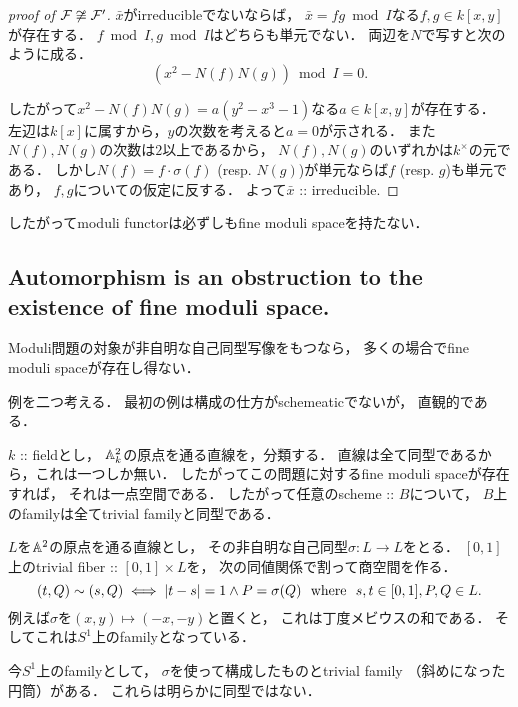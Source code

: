 \documentclass[a4paper]{jsarticle}
\newcommand{\famF}{\mathcal{F}}
\begin{document}
\begin{proof}[proof of $\famF \not \iso \famF'$]
        $\bar{x}$がirreducibleでないならば，
        $\bar{x}=fg \bmod I$なる$f,g \in k[x,y]$が存在する．
        $f \bmod I, g \bmod I$はどちらも単元でない．
        両辺を$N$で写すと次のように成る．
        \[ (x^2-N(f)N(g)) \bmod I=0. \]

        したがって$x^2-N(f)N(g)=a(y^2-x^3-1)$なる$a \in k[x,y]$が存在する．
        左辺は$k[x]$に属すから，$y$の次数を考えると$a=0$が示される．
        また$N(f), N(g)$の次数は$2$以上であるから，
        $N(f), N(g)$のいずれかは$k^{\times}$の元である．
        しかし$N(f)=f \cdot \sigma(f)$ (resp. $N(g)$)が単元ならば$f$ (resp. $g$)も単元であり，
        $f,g$についての仮定に反する．
        よって$\bar{x}$ :: irreducible.
    \end{proof}

    したがってmoduli functorは必ずしもfine moduli spaceを持たない．

    \subsection{Automorphism is an obstruction to the existence of fine moduli space.}
    Moduli問題の対象が非自明な自己同型写像をもつなら，
    多くの場合でfine moduli spaceが存在し得ない．

    例を二つ考える．
    最初の例は構成の仕方がschemeaticでないが，
    直観的である．
    \begin{Example}
        $k$ :: fieldとし，
        $\mathbb{A}^2_k$の原点を通る直線を，分類する．
        直線は全て同型であるから，これは一つしか無い．
        したがってこの問題に対するfine moduli spaceが存在すれば，
        それは一点空間である．
        したがって任意のscheme :: $B$について，
        $B$上のfamilyは全てtrivial familyと同型である．
        
        $L$を$\mathbb{A}^2$の原点を通る直線とし，
        その非自明な自己同型$\sigma: L \to L$をとる．
        $[0,1]$上のtrivial fiber :: $[0,1] \times L$を，
        次の同値関係で割って商空間を作る．
        \[ (t, Q) \sim (s, Q) \iff |t-s|=1 \land P=\sigma(Q) ~~\text{where}~~ s,t \in [0,1], P,Q \in L. \]
        例えば$\sigma$を$(x,y) \mapsto (-x,-y)$と置くと，
        これは丁度メビウスの和である．
        そしてこれは$S^1$上のfamilyとなっている．

        今$S^1$上のfamilyとして，
        $\sigma$を使って構成したものとtrivial family （斜めになった円筒）がある．
        これらは明らかに同型ではない．
    \end{Example}
\end{document}
